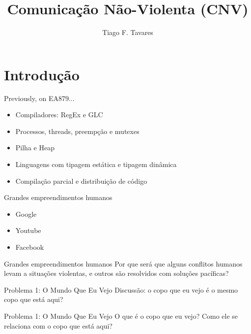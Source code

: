 \documentclass{beamer}
\title[CNV]{Comunicação Não-Violenta (CNV)}
\author{Tiago F. Tavares}
\institute{FEEC -- UNICAMP}
\date{}
\begin{document}
\begin{frame}
  \titlepage
\end{frame}


\section{Introdução}

\begin{frame}[fragile]{Previously, on EA879...}
  \centering
  \Large
  \begin{itemize}
    \item Compiladores: RegEx e GLC
    \item Processos, threads, preempção e mutexes
    \item Pilha e Heap
    \item Linguagens com tipagem estática e tipagem dinâmica
    \item Compilação parcial e distribuição de código
  \end{itemize}
\end{frame}

\begin{frame}{Grandes empreendimentos humanos}
  \LARGE
  \begin{itemize}
    \item Google
    \item Youtube
    \item Facebook
  \end{itemize}
\end{frame}

\begin{frame}{Grandes empreendimentos humanos}
  \Large
  Por que será que alguns conflitos humanos levam a situações violentas, e
  outros são resolvidos com soluções pacíficas?
\end{frame}

\begin{frame}{Problema 1: O Mundo Que Eu Vejo}
  \Large
  Discussão: o copo que eu vejo é o mesmo copo que está aqui?
\end{frame}

\begin{frame}{Problema 1: O Mundo Que Eu Vejo}
  \Large
  O que é o copo que eu vejo? Como ele se relaciona com o copo que está aqui?
\end{frame}
\end{document}
